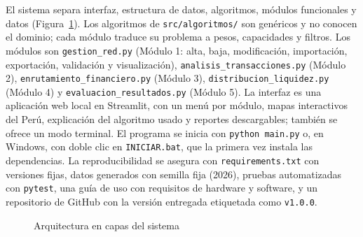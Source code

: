 \documentclass[11pt,a4paper]{article}
\newcommand{\id}[1]{\texttt{#1}}
\begin{document}
El sistema separa interfaz, estructura de datos, algoritmos, módulos funcionales y datos (Figura~\ref{fig:arq}).
Los algoritmos de \id{src/algoritmos/} son genéricos y no conocen el dominio; cada módulo traduce su problema a
pesos, capacidades y filtros. Los módulos son \id{gestion\_red.py} (Módulo 1: alta, baja, modificación, importación,
exportación, validación y visualización), \id{analisis\_transacciones.py} (Módulo 2),
\id{enrutamiento\_financiero.py} (Módulo 3), \id{distribucion\_liquidez.py} (Módulo 4) y
\id{evaluacion\_resultados.py} (Módulo 5). La interfaz es una aplicación web local en Streamlit, con un menú por
módulo, mapas interactivos del Perú, explicación del algoritmo usado y reportes descargables; también se ofrece un
modo terminal. El programa se inicia con \id{python main.py} o, en Windows, con doble clic en \id{INICIAR.bat}, que
la primera vez instala las dependencias. La reproducibilidad se asegura con \id{requirements.txt} con versiones
fijas, datos generados con semilla fija (2026), pruebas automatizadas con \id{pytest}, una guía de uso con requisitos
de hardware y software, y un repositorio de GitHub con la versión entregada etiquetada como \id{v1.0.0}.

\begin{figure}[H]
\caption{Arquitectura en capas del sistema}\label{fig:arq}
\centering
{}
\end{figure}
\end{document}
